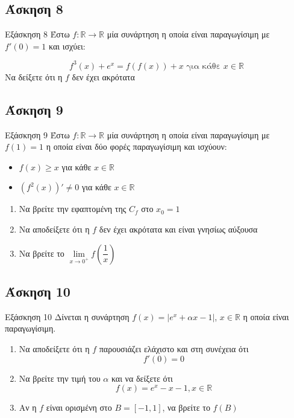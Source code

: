 \documentclass[greek]{beamer}
\begin{document}
\subsection{Άσκηση 8}
\begin{frame}[label=Άσκηση8,t]{Εξάσκηση 8}
Έστω $f:\mathbb{R}\to\mathbb{R}$ μία συνάρτηση η οποία είναι παραγωγίσιμη με $f'(0)=1$ και ισχύει:

$$f^3(x)+e^x=f(f(x))+x \text{ για κάθε } x\in\mathbb{R}$$
Να δείξετε ότι η $f$ δεν έχει ακρότατα

\end{frame}

\subsection{Άσκηση 9}
\begin{frame}[label=Άσκηση9,t]{Εξάσκηση 9}
Έστω $f:\mathbb{R}\to\mathbb{R}$ μία συνάρτηση η οποία είναι παραγωγίσιμη με $f(1)=1$ η οποία είναι δύο φορές παραγωγίσιμη και ισχύουν:
\begin{itemize}
  \item $f(x)\ge x$ για κάθε $x\in\mathbb{R}$
  \item $\left( f^2(x) \right)'\ne 0$ για κάθε $x\in\mathbb{R}$
\end{itemize}

\begin{enumerate}
  \item<1-> Να βρείτε την εφαπτομένη της $C_f$ στο $x_0=1$
  \item<2-> Να αποδείξετε ότι η $f$ δεν έχει ακρότατα και είναι γνησίως αύξουσα
  \item<3-> Να βρείτε το $\lim\limits_{x \to 0^+}{ f\left( \dfrac{1}{x} \right) }$
\end{enumerate}

\end{frame}

\subsection{Άσκηση 10}
\begin{frame}[label=Άσκηση10,t]{Εξάσκηση 10}
 Δίνεται η συνάρτηση $f(x)=|e^x+αx-1|$, $x\in\mathbb{R}$ η οποία είναι παραγωγίσιμη.
 \begin{enumerate}
   \item<1-> Να αποδείξετε ότι η $f$ παρουσιάζει ελάχιστο και στη συνέχεια ότι
   $$f'(0)=0$$
   \item<2-> Να βρείτε την τιμή του $α$ και να δείξετε ότι
   $$f(x)=e^x-x-1,x\in\mathbb{R}$$
   \item<3-> Αν η $f$ είναι ορισμένη στο $Β=[-1,1]$, να βρείτε το $f(Β)$
 \end{enumerate}

\end{frame}
\end{document}
